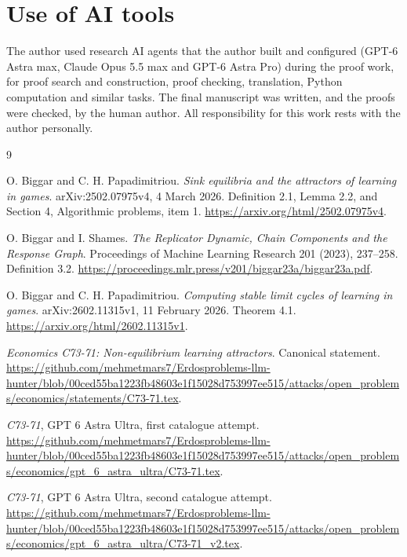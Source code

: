 \documentclass[11pt,a4paper]{article}
\numberwithin{equation}{section}
\theoremstyle{definition}
\begin{document}
\section*{Use of AI tools}
The author used research AI agents that the author built and configured (GPT-6 Astra max,
Claude Opus 5.5 max and GPT-6 Astra Pro) during the proof work, for proof search and
construction, proof checking, translation, Python computation and similar tasks. The final
manuscript was written, and the proofs were checked, by the human author. All responsibility
for this work rests with the author personally.

\begin{thebibliography}{9}\raggedright
{} O. Biggar and C. H. Papadimitriou.
\emph{Sink equilibria and the attractors of learning in games}.
arXiv:2502.07975v4, 4 March 2026.
Definition 2.1, Lemma 2.2, and Section 4, Algorithmic problems, item 1.
\url{https://arxiv.org/html/2502.07975v4}.

 O. Biggar and I. Shames.
\emph{The Replicator Dynamic, Chain Components and the Response Graph}.
Proceedings of Machine Learning Research 201 (2023), 237--258.
Definition 3.2.
\url{https://proceedings.mlr.press/v201/biggar23a/biggar23a.pdf}.

 O. Biggar and C. H. Papadimitriou.
\emph{Computing stable limit cycles of learning in games}.
arXiv:2602.11315v1, 11 February 2026. Theorem 4.1.
\url{https://arxiv.org/html/2602.11315v1}.

 \emph{Economics C73-71: Non-equilibrium learning
attractors}. Canonical statement.
\url{https://github.com/mehmetmars7/Erdosproblems-llm-hunter/blob/00ced55ba1223fb48603e1f15028d753997ee515/attacks/open_problems/economics/statements/C73-71.tex}.

 \emph{C73-71}, GPT 6 Astra Ultra, first catalogue attempt.
\url{https://github.com/mehmetmars7/Erdosproblems-llm-hunter/blob/00ced55ba1223fb48603e1f15028d753997ee515/attacks/open_problems/economics/gpt_6_astra_ultra/C73-71.tex}.

 \emph{C73-71}, GPT 6 Astra Ultra, second catalogue attempt.
\url{https://github.com/mehmetmars7/Erdosproblems-llm-hunter/blob/00ced55ba1223fb48603e1f15028d753997ee515/attacks/open_problems/economics/gpt_6_astra_ultra/C73-71_v2.tex}.
\end{thebibliography}
\end{document}
